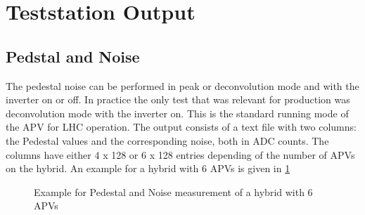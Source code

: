 \section{Teststation Output}

\subsection{Pedstal and Noise}
The pedestal noise can be performed in peak or deconvolution mode and with the inverter on or off.
In practice the only test that was relevant for production was deconvolution mode with the inverter on.
This is the standard running mode of the APV for LHC operation.
The output consists of a text file with two columns: the Pedestal values and the corresponding noise, both in ADC counts.
The columns have either 4 x 128 or 6 x 128 entries depending of the number of APVs on the hybrid.
An example for a hybrid with 6 APVs is given in \ref{fig:ped_noise_example}
\begin{figure}[h]
  \begin{center}
    \caption{Example for Pedestal and Noise measurement of a hybrid with 6 APVs}
    \label{fig:ped_noise_example}
  \end{center}
\end{figure}


